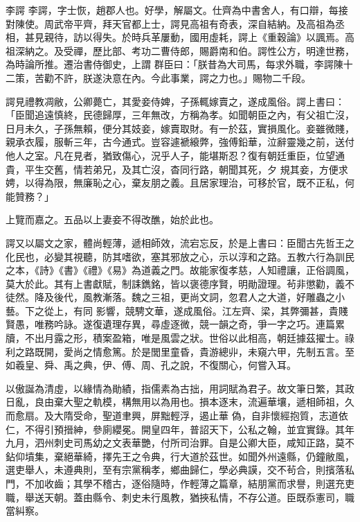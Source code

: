 
\begin{pinyinscope}

 李諤
 李諤，字士恢，趙郡人也。好學，解屬文。仕齊為中書舍人，有口辯，每接對陳使。周武帝平齊，拜天官都上士，諤見高祖有奇表，深自結納。及高祖為丞相，甚見親待，訪以得失。於時兵革屢動，國用虛耗，諤上《重穀論》以諷焉。高祖深納之。及受禪，歷比部、考功二曹侍郎，賜爵南和伯。諤性公方，明達世務，為時論所推。遷治書侍御史，上謂
 群臣曰：「朕昔為大司馬，每求外職，李諤陳十二策，苦勸不許，朕遂決意在內。今此事業，諤之力也。」賜物二千段。



 諤見禮教凋敝，公卿薨亡，其愛妾侍婢，子孫輒嫁賣之，遂成風俗。諤上書曰：「臣聞追遠慎終，民德歸厚，三年無改，方稱為孝。如聞朝臣之內，有父祖亡沒，日月未久，子孫無賴，便分其妓妾，嫁賣取財。有一於茲，實損風化。妾雖微賤，親承衣履，服斬三年，古今通式。豈容遽褫縗弊，強傅鉛華，泣辭靈幾之前，送付他人之室。凡在見者，猶致傷心，況乎人子，能堪斯忍？復有朝廷重臣，位望通貴，平生交舊，情若弟兄，及其亡沒，杳同行路，朝聞其死，夕
 規其妾，方便求娉，以得為限，無廉恥之心，棄友朋之義。且居家理治，可移於官，既不正私，何能贊務？」



 上覽而嘉之。五品以上妻妾不得改醮，始於此也。



 諤又以屬文之家，體尚輕薄，遞相師效，流宕忘反，於是上書曰：臣聞古先哲王之化民也，必變其視聽，防其嗜欲，塞其邪放之心，示以淳和之路。五教六行為訓民之本，《詩》《書》《禮》《易》為道義之門。故能家復孝慈，人知禮讓，正俗調風，莫大於此。其有上書獻賦，制誄鐫銘，皆以褒德序賢，明勛證理。茍非懲勸，義不徒然。降及後代，風教漸落。魏之三祖，更尚文詞，忽君人之大道，好雕蟲之小藝。下之從上，有同
 影響，競騁文華，遂成風俗。江左齊、梁，其弊彌甚，貴賤賢愚，唯務吟詠。遂復遺理存異，尋虛逐微，競一韻之奇，爭一字之巧。連篇累牘，不出月露之形，積案盈箱，唯是風雲之狀。世俗以此相高，朝廷據茲擢士。祿利之路既開，愛尚之情愈篤。於是閭里童昏，貴游總丱，未窺六甲，先制五言。至如羲皇、舜、禹之典，伊、傅、周、孔之說，不復關心，何嘗入耳。



 以傲誕為清虛，以緣情為勛績，指儒素為古拙，用詞賦為君子。故文筆日繁，其政日亂，良由棄大聖之軌模，構無用以為用也。損本逐末，流遍華壤，遞相師祖，久而愈扇。及大隋受命，聖道聿興，屏黜輕浮，遏止華
 偽，自非懷經抱質，志道依仁，不得引預搢紳，參廁纓冕。開皇四年，普詔天下，公私之翰，並宜實錄。其年九月，泗州刺史司馬幼之文表華艷，付所司治罪。自是公卿大臣，咸知正路，莫不鉆仰墳集，棄絕華綺，擇先王之令典，行大道於茲世。如聞外州遠縣，仍鐘敝風，選吏舉人，未遵典則，至有宗黨稱孝，鄉曲歸仁，學必典謨，交不茍合，則擯落私門，不加收齒；其學不稽古，逐俗隨時，作輕薄之篇章，結朋黨而求譽，則選充吏職，舉送天朝。蓋由縣令、刺史未行風教，猶挾私情，不存公道。臣既忝憲司，職當糾察。




\end{pinyinscope}
